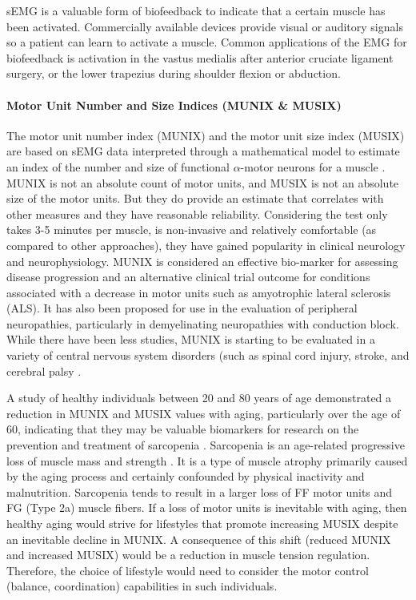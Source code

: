 sEMG is a valuable form of biofeedback to indicate that a certain muscle has been activated. Commercially available devices provide visual or auditory signals so a patient can learn to activate a muscle. Common applications of the EMG for biofeedback is activation in the vastus medialis after anterior cruciate ligament surgery, or the lower trapezius during shoulder flexion or abduction.

\paragraph{Motor Unit Number and Size Indices (MUNIX \& MUSIX)}

The motor unit number index (MUNIX) and the motor unit size index (MUSIX) are based on sEMG data interpreted through a mathematical model to estimate an index of the number and size of functional $\alpha$-motor neurons for a muscle \cite{nandedkar_motor_2004}. MUNIX is not an absolute count of motor units, and MUSIX is not an absolute size of the motor units. But they do provide an estimate that correlates with other measures and they have reasonable reliability. Considering the test only takes 3-5 minutes per muscle, is non-invasive and relatively comfortable (as compared to other approaches), they have gained popularity in clinical neurology and neurophysiology. MUNIX is considered an effective bio-marker for assessing disease progression and an alternative clinical trial outcome for conditions associated with a decrease in motor units such as amyotrophic lateral sclerosis (ALS). It has also been proposed for use in the evaluation of peripheral neuropathies, particularly in demyelinating neuropathies with conduction block. While there have been less studies, MUNIX is starting to be evaluated in a variety of central nervous system disorders (such as spinal cord injury, stroke, and cerebral palsy \cite{fatehi_utility_2018}. 

A study of healthy individuals between 20 and 80 years of age demonstrated a reduction in MUNIX and MUSIX values with aging, particularly over the age of 60, indicating that they may be valuable biomarkers for research on the prevention and treatment of sarcopenia \cite{cao_reference_2020}. Sarcopenia is an age-related progressive loss of muscle mass and strength \cite{dao_sarcopenia_2020}. It is a type of muscle atrophy primarily caused by the aging process and certainly confounded by physical inactivity and malnutrition. Sarcopenia tends to result in a larger loss of FF motor units and FG (Type 2a) muscle fibers. If a loss of motor units is inevitable with aging, then healthy aging would strive for lifestyles that promote increasing MUSIX despite an inevitable decline in MUNIX. A consequence of this shift (reduced MUNIX and increased MUSIX) would be a reduction in muscle tension regulation. Therefore, the choice of lifestyle would need to consider the motor control (balance, coordination) capabilities in such individuals.


